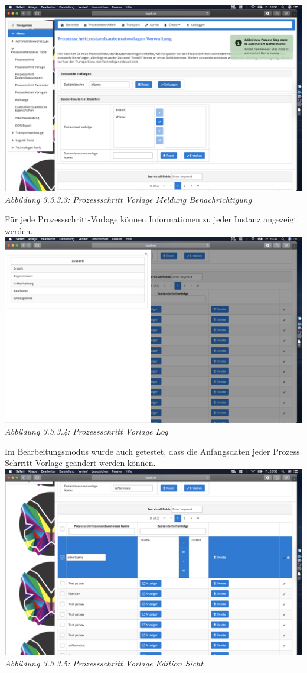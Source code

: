 \documentclass[enabledeprecatedfontcommands,fontsize=12pt,paper=a4,twoside]{scrartcl}
\begin{document}
\hypertarget{sc3.3.3.3}{
\includegraphics[width=1\textwidth]{Screenshots/333Addmessage.png}
\textit{Abbildung 3.3.3.3:  Prozessschritt Vorlage Meldung Benachrichtigung }
} 

Für jede Prozessschritt-Vorlage können Informationen zu jeder Instanz angezeigt werden.\\

\hypertarget{sc3.3.3.4}{
\includegraphics[width=1\textwidth]{Screenshots/333Log.png}
\textit{Abbildung 3.3.3.4:  Prozessschritt Vorlage Log}
} 

Im Bearbeitungsmodus wurde auch getestet, dass die Anfangsdaten jeder Prozess Schrritt Vorlage geändert werden können.\\

\hypertarget{sc3.3.3.5}{
\includegraphics[width=1\textwidth]{Screenshots/333EditView.png}
\textit{Abbildung 3.3.3.5:  Prozessschritt Vorlage Edition Sicht}
} 
\end{document}
